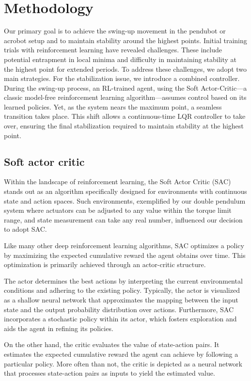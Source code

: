 \chapter{Methodology}
Our primary goal is to achieve the swing-up movement in the pendubot or acrobot setup and to maintain stability around the highest points. Initial training trials with reinforcement learning have revealed challenges. These include potential entrapment in local minima and difficulty in maintaining stability at the highest point for extended periods. To address these challenges, we adopt two main strategies. For the stabilization issue, we introduce a combined controller. During the swing-up process, an RL-trained agent, using the Soft Actor-Critic—a classic model-free reinforcement learning algorithm—assumes control based on its learned policies. Yet, as the system nears the maximum point, a seamless transition takes place. This shift allows a continuous-time LQR controller to take over, ensuring the final stabilization required to maintain stability at the highest point.

\section{Soft actor critic}
Within the landscape of reinforcement learning, the Soft Actor Critic (SAC)\cite{haarnoja2018soft} stands out as an algorithm specifically designed for environments with continuous state and action spaces. Such environments, exemplified by our double pendulum system where actuators can be adjusted to any value within the torque limit range, and state measurement can take any real number, influenced our decision to adopt SAC.

Like many other deep reinforcement learning algorithms, SAC optimizes a policy by maximizing the expected cumulative reward the agent obtains over time. This optimization is primarily achieved through an actor-critic structure\cite{konda1999actor}.

The actor determines the best actions by interpreting the current environmental conditions and adhering to the existing policy. Typically, the actor is visualized as a shallow neural network that approximates the mapping between the input state and the output probability distribution over actions. Furthermore, SAC incorporates a stochastic policy within its actor, which fosters exploration and aids the agent in refining its policies.

On the other hand, the critic evaluates the value of state-action pairs. It estimates the expected cumulative reward the agent can achieve by following a particular policy. More often than not, the critic is depicted as a neural network that processes state-action pairs as inputs to yield the estimated value.

